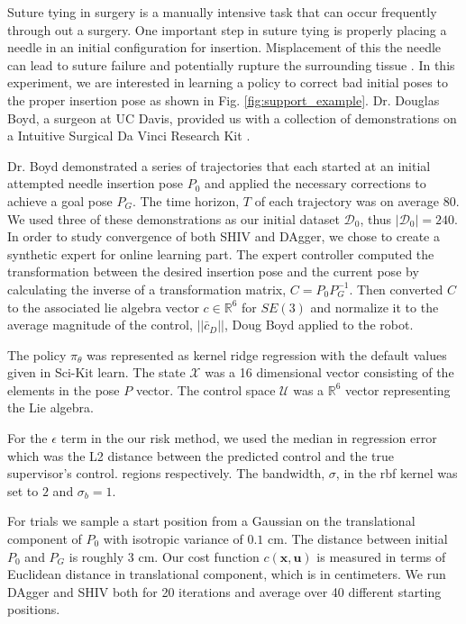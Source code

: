 \documentclass[10pt, conference]{ieeeconf}      %
\newcommand{\bu}{\mathbf{u}}
\newcommand{\bx}{\mathbf{x}}
\begin{document}
Suture tying in surgery is a manually intensive task that can occur frequently through out a surgery. One important step
in suture tying is properly placing a needle in an initial configuration for insertion. Misplacement of this the needle
can lead to suture failure and potentially rupture the surrounding tissue \cite{liu2015optimal}. In this experiment, we
are interested in learning a policy to correct bad initial poses to the proper insertion pose as shown in Fig.
\ref{fig:support_example}. Dr. Douglas Boyd, a surgeon at UC Davis, provided us with a collection of demonstrations on a Intuitive Surgical Da Vinci Research Kit \cite{AnnualReport2014}.

Dr. Boyd demonstrated a series of trajectories that each started at an initial attempted needle insertion pose $P_0$ and
applied the necessary corrections to achieve a goal pose $P_G$. The time horizon, $T$ of each trajectory was on average 80.  We used three of these demonstrations as our initial
dataset $\mathcal{D}_0$, thus $|\mathcal{D}_0| = 240$. In order to study convergence of both SHIV and DAgger, we chose to create a synthetic expert for online learning part. The expert controller computed the transformation between the desired insertion pose and the current pose  by calculating the inverse of a transformation matrix, $C = P_0P_G^{-1}$. Then converted $C$ to the associated lie algebra vector $c \in \mathbb{R}^6$ for $SE(3)$ and normalize it to the average magnitude of the control,  $||\bar{c}_D||$, Doug Boyd applied to the robot. 

The policy $\pi_{\theta}$ was represented as kernel ridge regression with the default values given in Sci-Kit learn. The state $\mathcal{X}$ was  a 16 dimensional vector consisting of the elements in the pose $P$ vector. The control space $\mathcal{U}$ was a $\mathbb{R}^6$ vector representing the Lie algebra. 

For the $\epsilon$ term in the our risk method, we used the median in regression error which was the L2 distance between the predicted control and the true supervisor's control. 
regions respectively. The bandwidth, $\sigma$, in the rbf kernel was set to $2$ and $\sigma_b = 1$.

For trials we sample a start position from a Gaussian on the translational component of $P_0$ with isotropic variance of
$0.1$ cm. The distance between initial $P_0$ and $P_G$ is roughly $3$ cm. Our cost function $c(\bx,\bu)$ is measured in
terms of Euclidean distance in translational component, which is in centimeters. We run DAgger and SHIV both for 20 iterations and average over 40 different starting positions.
\end{document}
